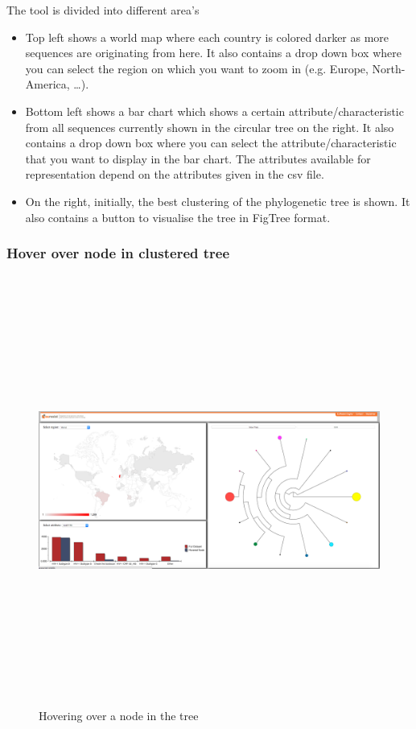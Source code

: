 \documentclass[a4paper, 11pt]{article} %
\begin{document}
The tool is divided into different area's
\begin{itemize}
  \item Top left shows a world map where each country is colored darker as more sequences are originating from here. It also contains a drop down box where you can select the region on which you want to zoom in (e.g. Europe, North-America, \ldots).
  \item Bottom left shows a bar chart which shows a certain attribute/characteristic from all sequences currently shown in the circular tree on the right. It also contains a drop down box where you can select the attribute/characteristic that you want to display in the bar chart. The attributes available for representation depend on the attributes given in the csv file.
  \item On the right, initially, the best clustering of the phylogenetic tree is shown. It also contains a button to visualise the tree in FigTree format.
\end{itemize}

\subsubsection{Hover over node in clustered tree}
\begin{figure}[H]
\centering
\includegraphics[width=400pt, height=400pt, keepaspectratio=true]{images/hover_node.PNG}
\caption{Hovering over a node in the tree}
\label{fig:hover_node}
\end{figure}
\end{document}
